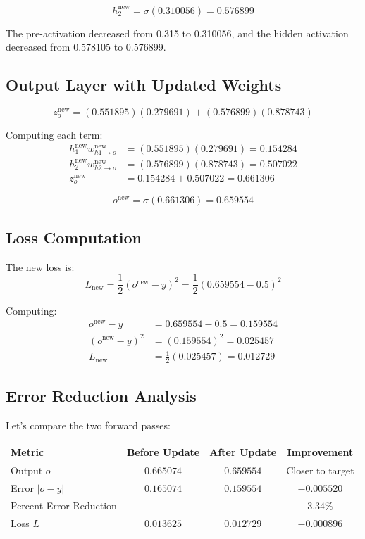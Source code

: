 \documentclass[12pt]{article}
\begin{document}
\[
h_2^{\text{new}} = \sigma(0.310056) = 0.576899
\]

The pre-activation decreased from 0.315 to 0.310056, and the hidden activation decreased from 0.578105 to 0.576899.

\subsection*{Output Layer with Updated Weights}

\[
z_o^{\text{new}} = (0.551895)(0.279691) + (0.576899)(0.878743)
\]

Computing each term:
\begin{align*}
h_1^{\text{new}} w_{h1 \to o}^{\text{new}} &= (0.551895)(0.279691) = 0.154284 \\
h_2^{\text{new}} w_{h2 \to o}^{\text{new}} &= (0.576899)(0.878743) = 0.507022 \\
z_o^{\text{new}} &= 0.154284 + 0.507022 = 0.661306
\end{align*}

\[
o^{\text{new}} = \sigma(0.661306) = 0.659554
\]

\subsection*{Loss Computation}

The new loss is:
\[
L_{\text{new}} = \frac{1}{2}(o^{\text{new}} - y)^2 = \frac{1}{2}(0.659554 - 0.5)^2
\]

Computing:
\begin{align*}
o^{\text{new}} - y &= 0.659554 - 0.5 = 0.159554 \\
(o^{\text{new}} - y)^2 &= (0.159554)^2 = 0.025457 \\
L_{\text{new}} &= \frac{1}{2}(0.025457) = 0.012729
\end{align*}

\subsection*{Error Reduction Analysis}

Let's compare the two forward passes:

\begin{center}
\begin{tabular}{|l|c|c|c|}
\hline
\textbf{Metric} & \textbf{Before Update} & \textbf{After Update} & \textbf{Improvement} \\
\hline
Output $o$ & $0.665074$ & $0.659554$ & Closer to target \\
Error $|o - y|$ & $0.165074$ & $0.159554$ & $-0.005520$ \\
Percent Error Reduction & --- & --- & $3.34\%$ \\
Loss $L$ & $0.013625$ & $0.012729$ & $-0.000896$ \\
\hline
\end{tabular}
\end{center}
\end{document}
